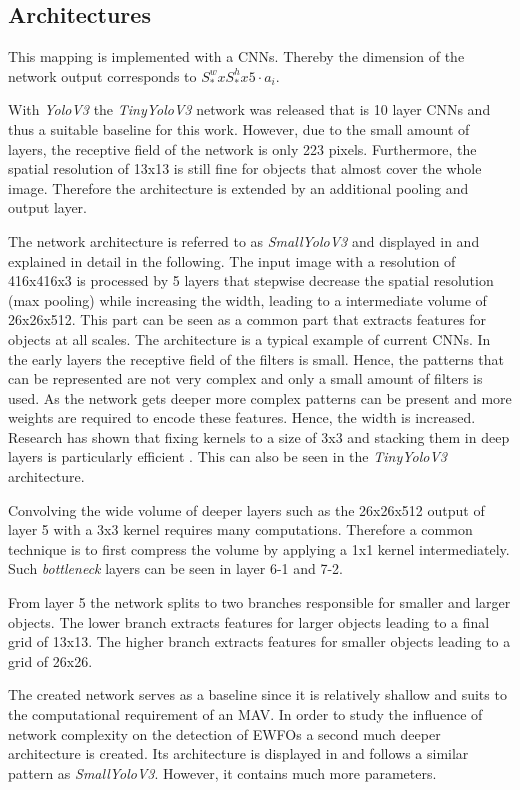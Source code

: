 \subsection{Architectures}

This mapping is implemented with a \acp{CNN}. Thereby the dimension of the network output corresponds to $S^w_*xS^h_*x5\cdot a_i$.

With \textit{YoloV3} the \textit{TinyYoloV3} network was released that is 10 layer \acp{CNN} and thus a suitable baseline for this work. However, due to the small amount of layers, the receptive field of the network is only 223 pixels. Furthermore, the spatial resolution of 13x13 is still fine for objects that almost cover the whole image. Therefore the architecture is extended by an additional pooling and output layer. 

The network architecture is referred to as \textit{SmallYoloV3} and displayed in  and explained in detail in the following. The input image with a resolution of 416x416x3 is processed by 5 layers that stepwise decrease the spatial resolution (max pooling) while increasing the width, leading to a intermediate volume of 26x26x512. This part can be seen as a common part that extracts features for objects at all scales. The architecture is a typical example of current \acp{CNN}. In the early layers the receptive field of the filters is small. Hence, the patterns that can be represented are not very complex and only a small amount of filters is used. As the network gets deeper more complex patterns can be present and more weights are required to encode these features. Hence, the width is increased. Research has shown that fixing kernels to a size of 3x3 and stacking them in deep layers is particularly efficient . This can also be seen in the \textit{TinyYoloV3} architecture. 

Convolving the wide volume of deeper layers such as the 26x26x512  output of layer 5 with a 3x3 kernel requires many computations. Therefore a common technique is to first compress the volume by applying a 1x1 kernel intermediately. Such \textit{bottleneck} layers can be seen in layer 6-1 and 7-2.

From layer 5 the network splits to two branches responsible for smaller and larger objects. The lower branch extracts features for larger objects leading to a final grid of 13x13. The higher branch extracts features for smaller objects leading to a grid of 26x26.

The created network serves as a baseline since it is relatively shallow and suits to the computational requirement of an \ac{MAV}. In order to study the influence of network complexity on the detection of \acp{EWFO} a second much deeper architecture is created. Its architecture is displayed in  and follows a similar pattern as \textit{SmallYoloV3}. However, it contains much more parameters.

